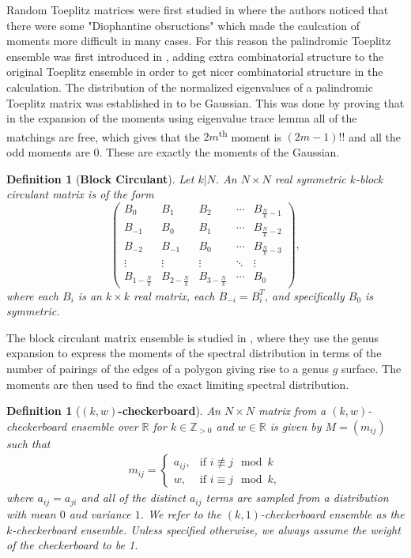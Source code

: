 \documentclass[11pt,reqno]{amsart}
\numberwithin{equation}{section}
\theoremstyle{plain}
\newtheorem{definition}[thm]{Definition}
\begin{document}
Random Toeplitz matrices were first studied in \cite{Toeplitz} where the authors noticed that there were some "Diophantine obsructions" which made the caulcation of moments more difficult in many cases. For this reason the palindromic Toeplitz ensemble was first introduced in \cite{palindromicToeplitz}, adding extra combinatorial structure to the original Toeplitz ensemble in order to get nicer combinatorial structure in the calculation. The distribution of the normalized eigenvalues of a palindromic Toeplitz matrix was established in \cite{palindromicToeplitz} to be Gaussian. This was done by proving that in the expansion of the moments using eigenvalue trace lemma all of the matchings are free, which gives that the $2m$\textsuperscript{th} moment is $(2m-1)!!$ and all the odd moments are $0$. These are exactly the moments of the Gaussian.



\begin{definition}[\textbf{Block Circulant}]\cite{Block Circulant}
Let $k|N$. An $N\times N$ real symmetric $k$-block circulant matrix is of the form
\begin{equation}
\left(\begin{array}{ccccc}
B_0 & B_1 & B_2 & \cdots & B_{\frac{N}{k}-1}\\
B_{-1} & B_0 & B_1 & \cdots & B_{\frac{N}{k}-2}\\
B_{-2} & B_{-1} & B_0 & \cdots & B_{\frac{N}{k}-3}\\
\vdots & \vdots & \vdots & \ddots & \vdots\\
B_{1-\frac{N}{k}} & B_{2-\frac{N}{k}} & B_{3-\frac{N}{k}} & \cdots & B_0
\end{array}\right),
\end{equation}
where each $B_i$ is an $k\times k$ real matrix, each $B_{-i} = B_i^T$, and specifically $B_0$ is symmetric.
\end{definition}

The block circulant matrix ensemble is studied in \cite{Block Circulant}, where they use the genus expansion to express the moments of the spectral distribution in terms of the number of pairings of the edges of a polygon giving rise to a genus $g$ surface. The moments are then used to find the exact limiting spectral distribution.

\begin{definition}[\textbf{$(k,w)$-checkerboard}]\cite{split}
An $N\times N$ matrix from a $(k,w)$-checkerboard ensemble over $\mathbb{R}$ for $k\in\mathbb{Z}_{>0}$ and $w\in\mathbb{R}$ is given by $M=(m_{ij})$ such that 
\begin{align}
m_{ij}=
\begin{cases}
a_{ij},& \text{if }i\not\equiv j\mod{k}\\
w,& \text{if }i\equiv j\mod{k},
\end{cases}
\end{align}
where $a_{ij}=a_{ji}$ and all of the distinct $a_{ij}$ terms are sampled from a distribution with mean $0$ and variance $1$. We refer to the $(k, 1)$-checkerboard ensemble as the $k$-checkerboard ensemble. Unless specified otherwise, we always assume the weight of the checkerboard to be 1.
\end{definition}
\end{document}
